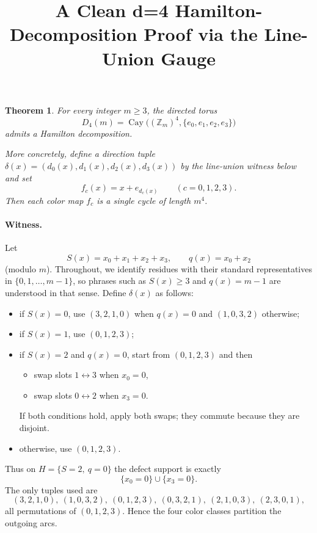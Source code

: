 \documentclass[11pt]{article}
\title{A Clean d=4 Hamilton-Decomposition Proof via the Line-Union Gauge}
\author{}
\date{}
\newtheorem{theorem}{Theorem}
\newcommand{\Zm}{\mathbb Z_m}
\begin{document}
\maketitle

\begin{theorem}
For every integer $m\ge 3$, the directed torus
\[
D_4(m)=\operatorname{Cay}\bigl((\Zm)^4,\{e_0,e_1,e_2,e_3\}\bigr)
\]
admits a Hamilton decomposition.

More concretely, define a direction tuple $\delta(x)=(d_0(x),d_1(x),d_2(x),d_3(x))$ by the line-union witness below and set
\[
f_c(x)=x+e_{d_c(x)}\qquad(c=0,1,2,3).
\]
Then each color map $f_c$ is a single cycle of length $m^4$.
\end{theorem}

\paragraph{Witness.}
Let
\[
S(x)=x_0+x_1+x_2+x_3,\qquad q(x)=x_0+x_2
\]
(modulo $m$). Throughout, we identify residues with their standard representatives in $\{0,1,\dots,m-1\}$, so phrases such as $S(x)\ge 3$ and $q(x)=m-1$ are understood in that sense. Define $\delta(x)$ as follows:
\begin{itemize}
    \item if $S(x)=0$, use $(3,2,1,0)$ when $q(x)=0$ and $(1,0,3,2)$ otherwise;
    \item if $S(x)=1$, use $(0,1,2,3)$;
    \item if $S(x)=2$ and $q(x)=0$, start from $(0,1,2,3)$ and then
    \begin{itemize}
        \item swap slots $1\leftrightarrow 3$ when $x_0=0$,
        \item swap slots $0\leftrightarrow 2$ when $x_3=0$.
    \end{itemize}
    If both conditions hold, apply both swaps; they commute because they are disjoint.
    \item otherwise, use $(0,1,2,3)$.
\end{itemize}
Thus on $H=\{S=2,\ q=0\}$ the defect support is exactly
\[
\{x_0=0\}\cup\{x_3=0\}.
\]
The only tuples used are
\[
(3,2,1,0),\ (1,0,3,2),\ (0,1,2,3),\ (0,3,2,1),\ (2,1,0,3),\ (2,3,0,1),
\]
all permutations of $(0,1,2,3)$. Hence the four color classes partition the outgoing arcs.
\end{document}
